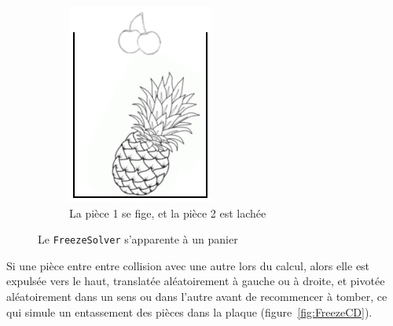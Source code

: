 \begin{figure}[!htb]
\begin{subfigure}{.4\linewidth}
        \includegraphics[width=\linewidth]{img/FreezeB.png}
        \caption{La pièce 1 se fige, et la pièce 2 est lachée}
    \end{subfigure}
    \caption{Le \texttt{FreezeSolver} s'apparente à un panier}
    \label{fig:FreezeAB}
\end{figure}


Si une pièce entre entre collision avec une autre lors du calcul, alors elle est expulsée vers le haut, translatée aléatoirement à gauche ou à droite, et pivotée aléatoirement dans un sens ou dans l'autre avant de recommencer à tomber, ce qui simule un entassement des pièces dans la plaque (figure~\ref{fig:FreezeCD}).\\

